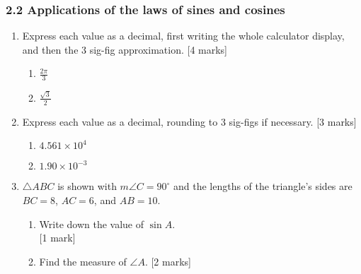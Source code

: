 \documentclass[12pt, twoside]{article}
\begin{document}
\subsubsection*{2.2 Applications of the laws of sines and cosines}

\begin{enumerate}

  \item Express each value as a decimal, first writing the whole calculator display, and then the 3 sig-fig approximation. \hfill [4 marks]
  \begin{multicols}{2}
    \begin{enumerate}
    \item $\displaystyle \frac{2\pi}{3}$
    \item $\displaystyle \frac{\sqrt{3}}{2}$
    \end{enumerate}
  \end{multicols} \vspace{2cm}

  \item Express each value as a decimal, rounding to 3 sig-figs if necessary. \hfill [3 marks]
  \begin{multicols}{2}
    \begin{enumerate}
    \item $4.561 \times 10^4$
    \item $1.90 \times 10^{-3}$
    \end{enumerate}
  \end{multicols}

  \newpage
  \item $\triangle ABC$ is shown with $m\angle C=90^\circ$ and the lengths of the triangle's sides are $BC=8$, $AC=6$, and $AB=10$.
  \begin{multicols}{2}
        \begin{enumerate}
        \item Write down the value of $\sin A$.  \\ \hfill [1 mark]\vspace{2cm}
        \item Find the measure of $\angle A$.  \hfill [2 marks] \vspace{1cm}
      \end{enumerate}
    \end{multicols}


\end{enumerate}
\end{document}

